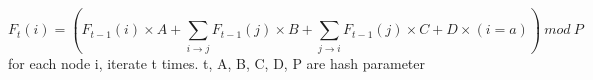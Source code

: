 $$F_t(i) = 
  (F_{t-1}(i) \times A + 
  \sum_{i\rightarrow j} F_{t-1}(j) \times B + 
  \sum_{j\rightarrow i} F_{t-1}(j) \times C +
  D \times (i = a))\ mod\ P
$$
for each node i, iterate t times.
t, A, B, C, D, P are hash parameter
